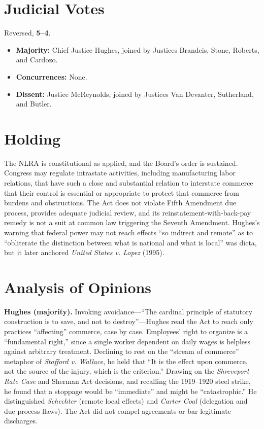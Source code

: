 \documentclass[12pt]{article}
\begin{document}
\section{Judicial Votes}

Reversed, \textbf{5--4}.
\begin{itemize}
\item \textbf{Majority:} Chief Justice Hughes, joined by Justices Brandeis, Stone, Roberts, and Cardozo.
\item \textbf{Concurrences:} None.
\item \textbf{Dissent:} Justice McReynolds, joined by Justices Van Devanter, Sutherland, and Butler.
\end{itemize}

\section{Holding}

The NLRA is constitutional as applied, and the Board's order is sustained. Congress may regulate intrastate activities, including manufacturing labor relations, that have such a close and substantial relation to interstate commerce that their control is essential or appropriate to protect that commerce from burdens and obstructions. The Act does not violate Fifth Amendment due process, provides adequate judicial review, and its reinstatement-with-back-pay remedy is not a suit at common law triggering the Seventh Amendment. Hughes's warning that federal power may not reach effects ``so indirect and remote'' as to ``obliterate the distinction between what is national and what is local'' was dicta, but it later anchored \textit{United States v. Lopez} (1995).

\section{Analysis of Opinions}

\textbf{Hughes (majority).} Invoking avoidance---``The cardinal principle of statutory construction is to save, and not to destroy''---Hughes read the Act to reach only practices ``affecting'' commerce, case by case. Employees' right to organize is a ``fundamental right,'' since a single worker dependent on daily wages is helpless against arbitrary treatment. Declining to rest on the ``stream of commerce'' metaphor of \textit{Stafford v. Wallace}, he held that ``It is the effect upon commerce, not the source of the injury, which is the criterion.'' Drawing on the \textit{Shreveport Rate Case} and Sherman Act decisions, and recalling the 1919--1920 steel strike, he found that a stoppage would be ``immediate'' and might be ``catastrophic.'' He distinguished \textit{Schechter} (remote local effects) and \textit{Carter Coal} (delegation and due process flaws). The Act did not compel agreements or bar legitimate discharges.
\end{document}
